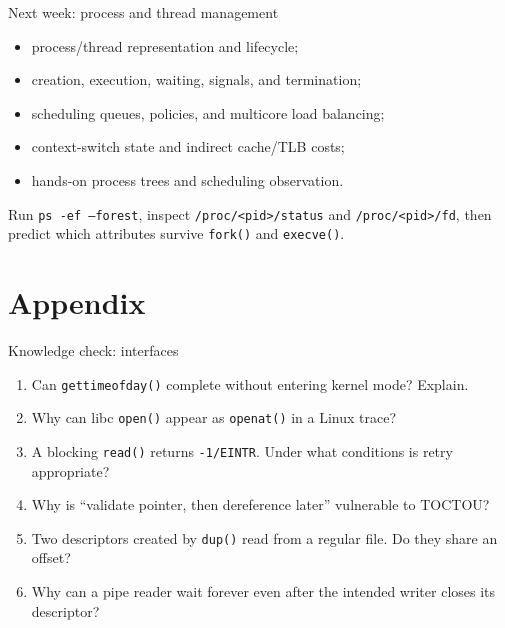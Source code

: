 \documentclass[aspectratio=169,11pt]{beamer}
\newcommand{\code}[1]{\texttt{#1}}
\begin{document}
\begin{frame}{Next week: process and thread management}
  \begin{itemize}
    \item process/thread representation and lifecycle;
    \item creation, execution, waiting, signals, and termination;
    \item scheduling queues, policies, and multicore load balancing;
    \item context-switch state and indirect cache/TLB costs;
    \item hands-on process trees and scheduling observation.
  \end{itemize}
  \begin{tcolorbox}[title=Preparation]
    Run \code{ps -ef --forest}, inspect \code{/proc/<pid>/status} and \code{/proc/<pid>/fd}, then predict which attributes survive \code{fork()} and \code{execve()}.
  \end{tcolorbox}
\end{frame}

\appendix
\section{Appendix}

\begin{frame}{Knowledge check: interfaces}
  \begin{enumerate}
    \item Can \code{gettimeofday()} complete without entering kernel mode? Explain.
    \item Why can libc \code{open()} appear as \code{openat()} in a Linux trace?
    \item A blocking \code{read()} returns \code{-1/EINTR}. Under what conditions is retry appropriate?
    \item Why is ``validate pointer, then dereference later'' vulnerable to TOCTOU?
    \item Two descriptors created by \code{dup()} read from a regular file. Do they share an offset?
    \item Why can a pipe reader wait forever even after the intended writer closes its descriptor?
  \end{enumerate}
\end{frame}
\end{document}
